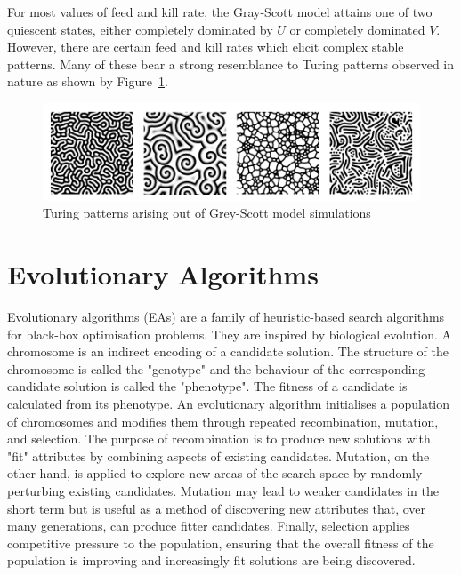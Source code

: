 For most values of feed and kill rate, the Gray-Scott model attains one of two quiescent states, either completely dominated by $U$ or completely dominated $V$. However, there are certain feed and kill rates which elicit complex stable patterns. Many of these bear a strong resemblance to Turing patterns observed in nature as shown by Figure~\ref{fig:gs-turing-patterns}.

\begin{figure}[H]
\centering
\includegraphics[width=\textwidth]{images/turing-patterns.png}
\caption{Turing patterns arising out of Grey-Scott model simulations\cite{sims}}
\label{fig:gs-turing-patterns}
\end{figure}

\section{Evolutionary Algorithms}

Evolutionary algorithms (EAs) are a family of heuristic-based search algorithms for black-box optimisation problems. They are inspired by biological evolution. A chromosome is an indirect encoding of a candidate solution. The structure of the chromosome is called the "genotype" and the behaviour of the corresponding candidate solution is called the "phenotype". The fitness of a candidate is calculated from its phenotype. An evolutionary algorithm initialises a population of chromosomes and modifies them through repeated recombination, mutation, and selection. The purpose of recombination is to produce new solutions with "fit" attributes by combining aspects of existing candidates. Mutation, on the other hand, is applied to explore new areas of the search space by randomly perturbing existing candidates. Mutation may lead to weaker candidates in the short term but is useful as a method of discovering new attributes that, over many generations, can produce fitter candidates. Finally, selection applies competitive pressure to the population, ensuring that the overall fitness of the population is improving and increasingly fit solutions are being discovered.\\

